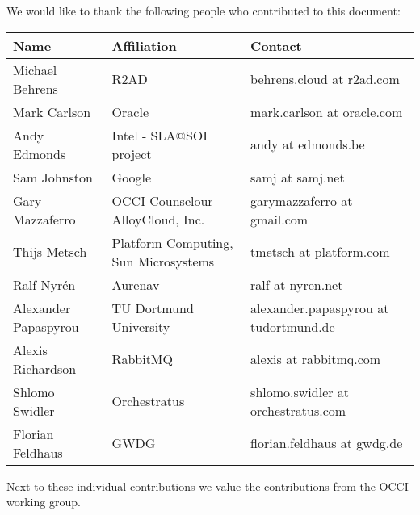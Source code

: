 
We would like to thank the following people who contributed to this
document:

\begin{tabular}{l|p{2in}|p{2in}}
Name & Affiliation & Contact \\
\hline
Michael Behrens & R2AD & behrens.cloud at r2ad.com \\
Mark Carlson & Oracle & mark.carlson at oracle.com \\
Andy Edmonds & Intel - SLA@SOI project & andy at edmonds.be \\
Sam Johnston & Google & samj at samj.net \\
Gary Mazzaferro & OCCI Counselour - AlloyCloud, Inc. &  garymazzaferro at gmail.com \\ 
Thijs Metsch & Platform Computing, Sun Microsystems & tmetsch at platform.com \\
Ralf Nyrén & Aurenav & ralf at nyren.net \\
Alexander Papaspyrou & TU Dortmund University & alexander.papaspyrou at tu\-dortmund.de \\
Alexis Richardson & RabbitMQ & alexis at rabbitmq.com \\
Shlomo Swidler & Orchestratus & shlomo.swidler at orchestratus.com \\
Florian Feldhaus & GWDG & florian.feldhaus at gwdg.de \\
\end{tabular}

Next to these individual contributions we value the contributions from
the OCCI working group.
